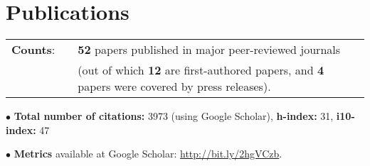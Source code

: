 \documentclass[11pt,letterpaper,sans]{moderncv}
\begin{document}
 \vspace{-0.1cm}
 \vspace{-0.1cm}
 \vspace{-0.1cm}
 \vspace{-0.1cm}

\vspace{-2mm}
\section{Publications}

\cvitem{}
{
\begin{tabular}{rcl}
\textbf{Counts}: &\hspace{0.3cm} &{\textbf{52} papers published in major peer-reviewed journals} \\
& &{(out of which \textbf{12} are first-authored papers, and \textbf{4} papers were covered by press releases).}
\end{tabular}
}

$\bullet$ \textbf{Total number of citations:} 3973 (using Google Scholar), \textbf{h-index:} 31, \textbf{i10-index:} 47

$\bullet$ \textbf{Metrics} available at Google Scholar: {\color{color1} \href{http://bit.ly/2hgVCzb}{http://bit.ly/2hgVCzb}}.
\end{document}
